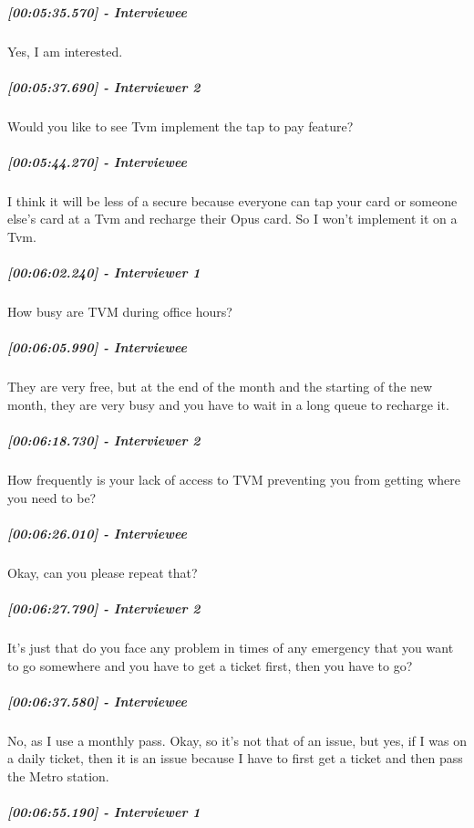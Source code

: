 \documentclass[a4paper,12pt]{article}
\begin{document}
\hypertarget{interviewee-26}{%
\subparagraph{{[}00:05:35.570{]} - Interviewee}\label{interviewee-26}}

Yes, I am interested.

\hypertarget{interviewer-2-14}{%
\subparagraph{{[}00:05:37.690{]} - Interviewer
2}\label{interviewer-2-14}}

Would you like to see Tvm implement the tap to pay feature?

\hypertarget{interviewee-27}{%
\subparagraph{{[}00:05:44.270{]} - Interviewee}\label{interviewee-27}}

I think it will be less of a secure because everyone can tap your card
or someone else's card at a Tvm and recharge their Opus card. So I won't
implement it on a Tvm.

\hypertarget{interviewer-1-15}{%
\subparagraph{{[}00:06:02.240{]} - Interviewer
1}\label{interviewer-1-15}}

How busy are TVM during office hours?

\hypertarget{interviewee-28}{%
\subparagraph{{[}00:06:05.990{]} - Interviewee}\label{interviewee-28}}

They are very free, but at the end of the month and the starting of the
new month, they are very busy and you have to wait in a long queue to
recharge it.

\hypertarget{interviewer-2-15}{%
\subparagraph{{[}00:06:18.730{]} - Interviewer
2}\label{interviewer-2-15}}

How frequently is your lack of access to TVM preventing you from getting
where you need to be?

\hypertarget{interviewee-29}{%
\subparagraph{{[}00:06:26.010{]} - Interviewee}\label{interviewee-29}}

Okay, can you please repeat that?

\hypertarget{interviewer-2-16}{%
\subparagraph{{[}00:06:27.790{]} - Interviewer
2}\label{interviewer-2-16}}

It's just that do you face any problem in times of any emergency that
you want to go somewhere and you have to get a ticket first, then you
have to go?

\hypertarget{interviewee-30}{%
\subparagraph{{[}00:06:37.580{]} - Interviewee}\label{interviewee-30}}

No, as I use a monthly pass. Okay, so it's not that of an issue, but
yes, if I was on a daily ticket, then it is an issue because I have to
first get a ticket and then pass the Metro station.

\hypertarget{interviewer-1-16}{%
\subparagraph{{[}00:06:55.190{]} - Interviewer
1}\label{interviewer-1-16}}
\end{document}
